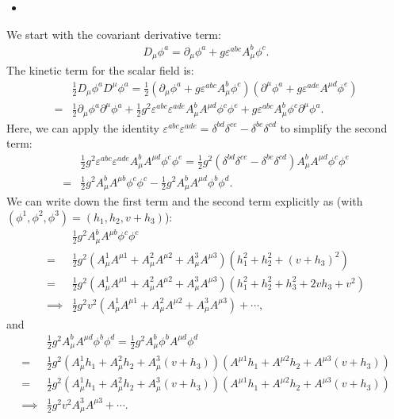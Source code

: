 \begin{itemize}
    \item [(b)]
\end{itemize}
We start with the covariant derivative term:
\begin{align}
    D_\mu \phi^a = \partial_\mu \phi^a + g \varepsilon^{abc} A_\mu^b \phi^c.
\end{align}
The kinetic term for the scalar field is:
\begin{align}
    &\frac{1}{2} D_\mu \phi^a D^\mu \phi^a = \frac{1}{2} \left( \partial_\mu \phi^a + g \varepsilon^{abc} A_\mu^b \phi^c \right) \left( \partial^\mu \phi^a + g \varepsilon^{ade} A^{\mu d} \phi^e \right)\\
    =&\frac{1}{2} \partial_\mu \phi^a \partial^\mu \phi^a + \frac{1}{2} g^2 \varepsilon^{abc} \varepsilon^{ade} A_\mu^b A^{\mu d} \phi^c \phi^e + g \varepsilon^{abc} A_\mu^b \phi^c \partial^\mu \phi^a.
\end{align}
Here, we can apply the identity $\varepsilon^{abc} \varepsilon^{ade} = \delta^{bd} \delta^{ce} - \delta^{be} \delta^{cd}$ to simplify the second term:
\begin{align}
    &\frac{1}{2} g^2 \varepsilon^{abc} \varepsilon^{ade} A_\mu^b A^{\mu d} \phi^c \phi^e = \frac{1}{2} g^2 (\delta^{bd} \delta^{ce} - \delta^{be} \delta^{cd}) A_\mu^b A^{\mu d} \phi^c \phi^e\\
    =& \frac{1}{2} g^2 A_\mu^b A^{\mu b} \phi^c \phi^c - \frac{1}{2} g^2 A_\mu^b A^{\mu d} \phi^b \phi^d.
\end{align}
We can write down the first term and the second term explicitly as (with $(\phi^1, \phi^2, \phi^3) = (h_1, h_2, v+h_3)$):
\begin{align}
    &\frac{1}{2} g^2 A_\mu^b A^{\mu b} \phi^c \phi^c\\
    =&\frac{1}{2}g^2 (A_\mu^1 A^{\mu 1} + A_\mu^2 A^{\mu 2} + A_\mu^3 A^{\mu 3}) (h_1^2 + h_2^2 + (v+h_3)^2)\\
    =&\frac{1}{2}g^2 (A_\mu^1 A^{\mu 1} + A_\mu^2 A^{\mu 2} + A_\mu^3 A^{\mu 3}) (h_1^2 + h_2^2 + h_3^2 + 2vh_3 + v^2)\\
    \implies& \frac{1}{2}g^2 v^2 (A_\mu^1 A^{\mu 1} + A_\mu^2 A^{\mu 2} + A_\mu^3 A^{\mu 3}) + \cdots,
\end{align}
and 
\begin{align}
    &\frac{1}{2} g^2 A_\mu^b A^{\mu d} \phi^b \phi^d=\frac{1}{2} g^2 A_\mu^b \phi^b  A^{\mu d} \phi^d\\
    =&\frac{1}{2} g^2 (A_\mu^1 h_1 + A_\mu^2 h_2 + A_\mu^3 (v+h_3)) (A^{\mu 1} h_1 + A^{\mu 2} h_2 + A^{\mu 3} (v+h_3))\\
    =&\frac{1}{2} g^2 (A_\mu^1 h_1 + A_\mu^2 h_2 + A_\mu^3 (v+h_3)) (A^{\mu 1} h_1 + A^{\mu 2} h_2 + A^{\mu 3} (v+h_3))\\
    \implies& \frac{1}{2} g^2 v^2 A_\mu^3 A^{\mu 3} + \cdots.
\end{align}

